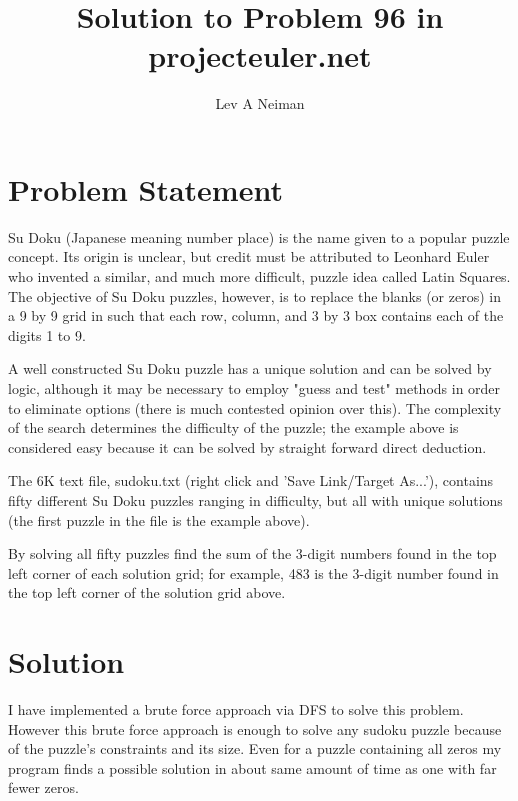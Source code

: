 \documentclass[11pt]{article}
\begin{document}
\title{Solution to Problem 96 in projecteuler.net}
\author{Lev A Neiman}

\maketitle

\section{Problem Statement}

Su Doku (Japanese meaning number place) is the name given to a popular puzzle concept. Its origin is unclear, but credit must be attributed to Leonhard Euler who invented a similar, and much more difficult, puzzle idea called Latin Squares. The objective of Su Doku puzzles, however, is to replace the blanks (or zeros) in a 9 by 9 grid in such that each row, column, and 3 by 3 box contains each of the digits 1 to 9.

A well constructed Su Doku puzzle has a unique solution and can be solved by logic, although it may be necessary to employ "guess and test" methods in order to eliminate options (there is much contested opinion over this). The complexity of the search determines the difficulty of the puzzle; the example above is considered easy because it can be solved by straight forward direct deduction.

The 6K text file, sudoku.txt (right click and 'Save Link/Target As...'), contains fifty different Su Doku puzzles ranging in difficulty, but all with unique solutions (the first puzzle in the file is the example above).

By solving all fifty puzzles find the sum of the 3-digit numbers found in the top left corner of each solution grid; for example, 483 is the 3-digit number found in the top left corner of the solution grid above.

\section{Solution}

I have implemented a brute force approach via DFS to solve this problem.  However this brute force approach is enough to solve any sudoku puzzle because of the puzzle's constraints and its size.  Even for a puzzle containing all zeros my program finds a possible solution in about same amount of time as one with far fewer zeros.
\end{document}
